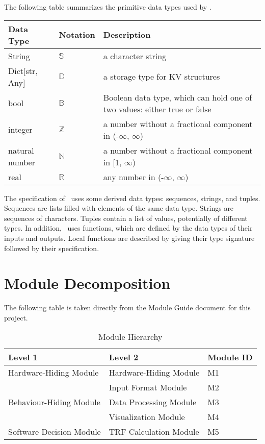 \documentclass[12pt, titlepage]{article}
\begin{document}
The following table summarizes the primitive data types used by \progname.

\begin{center}
\renewcommand{\arraystretch}{1.2}
\noindent
\begin{tabular}{l l p{7.5cm}}
\toprule
\textbf{Data Type} & \textbf{Notation} & \textbf{Description}\\
\midrule
String & $\mathbb{S}$ & a character string \\
Dict[str, Any]
 & $\mathbb{D}$ & a storage type for KV structures \\
bool & $\mathbb{B}$ &  Boolean data type, which can hold one of two values: either true or false \\
integer & $\mathbb{Z}$ & a number without a fractional component in (-$\infty$, $\infty$) \\
natural number & $\mathbb{N}$ & a number without a fractional component in [1, $\infty$) \\
real & $\mathbb{R}$ & any number in (-$\infty$, $\infty$)\\
\bottomrule
\end{tabular}
\end{center}

\noindent
The specification of \progname \ uses some derived data types: sequences, strings, and
tuples. Sequences are lists filled with elements of the same data type. Strings
are sequences of characters. Tuples contain a list of values, potentially of
different types. In addition, \progname \ uses functions, which
are defined by the data types of their inputs and outputs. Local functions are
described by giving their type signature followed by their specification.

\section{Module Decomposition}

The following table is taken directly from the Module Guide document for this project.

\begin{table}[h!]
\centering
\begin{tabular}{p{} p{}p{}}
\toprule
\textbf{Level 1} & \textbf{Level 2}& \textbf{Module ID}\\
\midrule

{Hardware-Hiding Module} &  Hardware-Hiding Module
 & M1 \\
\midrule

\multirow{3}{0.3\textwidth}{Behaviour-Hiding Module}
& Input Format Module & M2\\
& Data Processing Module & M3\\
& Visualization Module & M4\\

\midrule

\multirow{1}{0.3\textwidth}{Software Decision Module} & TRF Calculation Module & M5\\
\bottomrule

\end{tabular}
\caption{Module Hierarchy}
\label{TblMH}
\end{table}
\end{document}
